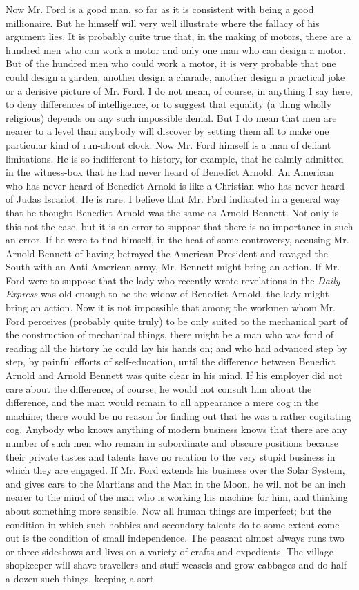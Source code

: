 \documentclass{book}
\begin{document}
Now Mr. Ford is a good man, so far as it is consistent with being a good millionaire. But he himself will very well illustrate where the fallacy of his argument lies. It is probably quite true that, in the making of motors, there are a hundred men who can work a motor and only one man who can design a motor. But of the hundred men who could work a motor, it is very probable that one could design a garden, another design a charade, another design a practical joke or a derisive picture of Mr. Ford. I do not mean, of course, in anything I say here, to deny differences of intelligence, or to suggest that equality (a thing wholly religious) depends on any such impossible denial. But I do mean that men are nearer to a level than anybody will discover by setting them all to make one particular kind of run-about clock. Now Mr. Ford himself is a man of defiant limitations. He is so indifferent to history, for example, that he calmly admitted in the witness-box that he had never heard of Benedict Arnold. An American who has never heard of Benedict Arnold is like a Christian who has never heard of Judas Iscariot. He is rare. I believe that Mr. Ford indicated in a general way that he thought Benedict Arnold was the same as Arnold Bennett. Not only is this not the case, but it is an error to suppose that there is no importance in such an error. If he were to find himself, in the heat of some controversy, accusing Mr. Arnold Bennett of having betrayed the American President and ravaged the South with an Anti-American army, Mr. Bennett might bring an action. If Mr. Ford were to suppose that the lady who recently wrote revelations in the \emph{Daily Express} was old enough to be the widow of Benedict Arnold, the lady might bring an action. Now it is not impossible that among the workmen whom Mr. Ford perceives (probably quite truly) to be only suited to the mechanical part of the construction of mechanical things, there might be a man who was fond of reading all the history he could lay his hands on; and who had advanced step by step, by painful efforts of self-education, until the difference between Benedict Arnold and Arnold Bennett was quite clear in his mind. If his employer did not care about the difference, of course, he would not consult him about the difference, and the man would remain to all appearance a mere cog in the machine; there would be no reason for finding out that he was a rather cogitating cog. Anybody who knows anything of modern business knows that there are any number of such men who remain in subordinate and obscure positions because their private tastes and talents have no relation to the very stupid business in which they are engaged. If Mr. Ford extends his business over the Solar System, and gives cars to the Martians and the Man in the Moon, he will not be an inch nearer to the mind of the man who is working his machine for him, and thinking about something more sensible. Now all human things are imperfect; but the condition in which such hobbies and secondary talents do to some extent come out is the condition of small independence. The peasant almost always runs two or three sideshows and lives on a variety of crafts and expedients. The village shopkeeper will shave travellers and stuff weasels and grow cabbages and do half a dozen such things, keeping a sort 
\end{document}
